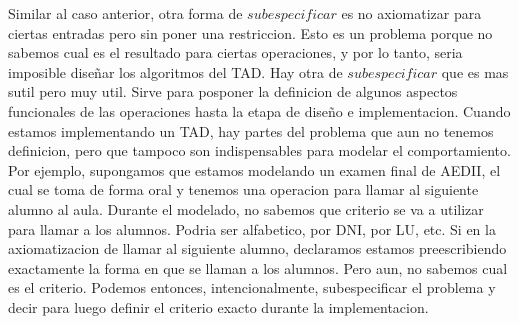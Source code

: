 \documentclass[10pt,a4paper]{article}
\begin{document}
\newline
Similar al caso anterior, otra forma de $subespecificar$ es no axiomatizar para ciertas entradas pero sin poner una restriccion. Esto es un problema porque no sabemos cual es el resultado para ciertas operaciones, y por lo tanto, seria imposible diseñar los algoritmos del TAD.      
\newline
\newline
\newline
Hay otra de $subespecificar$ que es mas sutil pero muy util. Sirve para posponer la definicion de algunos aspectos funcionales de las operaciones hasta la etapa de diseño e implementacion. Cuando estamos implementando un TAD, hay partes del problema que aun no tenemos definicion, pero que tampoco son indispensables para modelar el comportamiento. 
\newline
\newline
Por ejemplo, supongamos que estamos modelando un examen final de AEDII, el cual se toma de forma oral y tenemos una operacion para llamar al siguiente alumno al aula. Durante el modelado, no sabemos que criterio se va a utilizar para llamar a los alumnos. Podria ser alfabetico, por DNI, por LU, etc. Si en la axiomatizacion de llamar al siguiente alumno, declaramos  estamos preescribiendo exactamente la forma en que se llaman a los alumnos. Pero aun, no sabemos cual es el criterio. Podemos entonces, intencionalmente, subespecificar el problema y decir  para luego definir el criterio exacto durante la implementacion.  
\newpage
\end{document}
